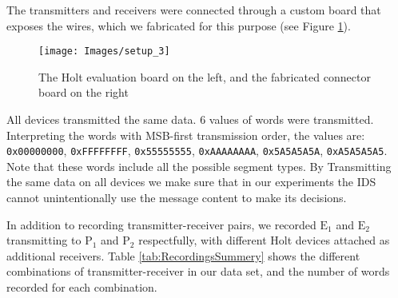 \documentclass[conference]{IEEEtran}
\begin{document}
  The transmitters and receivers were connected through a custom board that exposes the wires, which we fabricated for this purpose (see Figure \ref{fig:SetupImage}).
  
  \begin{figure}[t]
    \centering
    \texttt{[image: Images/setup\_3]}
    \caption{The Holt evaluation board on the left, and the fabricated connector board on the right}
    \label{fig:SetupImage}
  \end{figure}
  
  All devices transmitted the same data. 6 values of words were transmitted. Interpreting the words with MSB-first transmission order, the values are: \texttt{0x00000000}, \texttt{0xFFFFFFFF}, \texttt{0x55555555}, \texttt{0xAAAAAAAA}, \texttt{0x5A5A5A5A}, \texttt{0xA5A5A5A5}. Note that these words include all the possible segment types. By Transmitting the same data on all devices we make sure that in our experiments the IDS cannot unintentionally use the message content to make its decisions.
  
  In addition to recording transmitter-receiver pairs, we recorded \(\text{E}_1\) and \(\text{E}_2\) transmitting to \(\text{P}_1\) and \(\text{P}_2\) respectfully, with different Holt devices attached as additional receivers. Table \ref{tab:RecordingsSummery} shows the different combinations of transmitter-receiver in our data set, and the number of words recorded for each combination.
  
\end{document}
